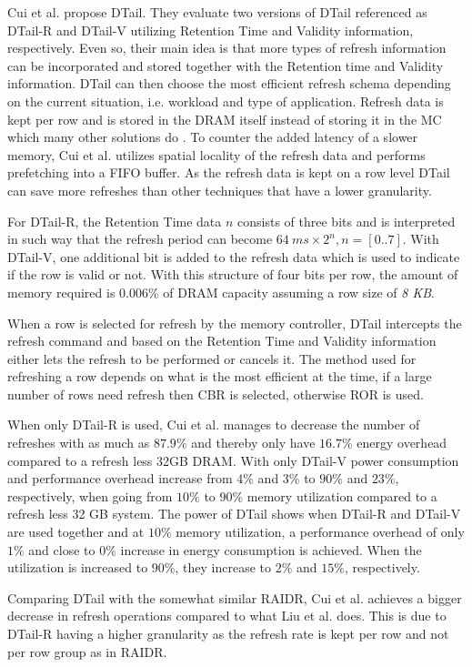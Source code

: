 Cui et al. \cite{dtail} propose DTail. They evaluate two versions of DTail referenced as DTail-R and DTail-V utilizing Retention Time and Validity information, respectively. Even so, their main idea is that more types of refresh information can be incorporated and stored together with the Retention time and Validity information. DTail can then choose the most efficient refresh schema depending on the current situation, i.e. workload and type of application. Refresh data is kept per row and is stored in the DRAM itself instead of storing it in the MC which many other solutions do \cite{raidr}\cite{smartrefresh}\cite{refrint}. To counter the added latency of a slower memory, Cui et al. utilizes spatial locality of the refresh data and performs prefetching into a FIFO buffer. As the refresh data is kept on a row level DTail can save more refreshes than other techniques that have a lower granularity.

For DTail-R, the Retention Time data $n$ consists of three bits and is interpreted in such way that the refresh period can become \(64\:ms \times 2^n, n = [0..7]\). With DTail-V, one additional bit is added to the refresh data which is used to indicate if the row is valid or not. With this structure of four bits per row, the amount of memory required is $0.006\%$ of DRAM capacity assuming a row size of \textit{8 KB}.

When a row is selected for refresh by the memory controller, DTail intercepts the refresh command and based on the Retention Time and Validity information either lets the refresh to be performed or cancels it. The method used for refreshing a row depends on what is the most efficient at the time, if a large number of rows need refresh then CBR is selected, otherwise ROR is used. 

When only DTail-R is used, Cui et al. manages to decrease the number of refreshes with as much as $87.9\%$ and thereby only have $16.7\%$ energy overhead compared to a refresh less 32GB DRAM. With only DTail-V power consumption and performance overhead increase from $4\%$ and $3\%$ to $90\%$ and $23\%$, respectively, when going from $10\%$ to $90\%$ memory utilization compared to a refresh less 32 GB system. The power of DTail shows when DTail-R and DTail-V are used together and at $10\%$ memory utilization, a performance overhead of only $1\%$ and close to $0\%$ increase in energy consumption is achieved. When the utilization is increased to $90\%$, they increase to $2\%$ and $15\%$, respectively.

Comparing DTail with the somewhat similar RAIDR, Cui et al. achieves a bigger decrease in refresh operations compared to what Liu et al. does. This is due to DTail-R having a higher granularity as the refresh rate is kept per row and not per row group as in RAIDR.
